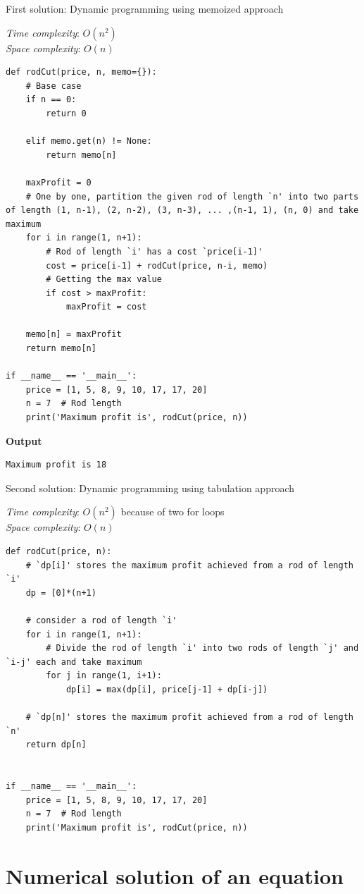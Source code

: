 \documentclass[a4paper,11pt]{book}
\begin{document}
\noindent First solution: Dynamic programming using memoized approach

\noindent \textit{Time complexity}: $O(n^2)$\\
\noindent \textit{Space complexity}: $O(n)$
\begin{lstlisting}
def rodCut(price, n, memo={}):
    # Base case
    if n == 0:
        return 0

    elif memo.get(n) != None:
        return memo[n]
 
    maxProfit = 0
    # One by one, partition the given rod of length `n' into two parts of length (1, n-1), (2, n-2), (3, n-3), ... ,(n-1, 1), (n, 0) and take maximum
    for i in range(1, n+1):
        # Rod of length `i' has a cost `price[i-1]'
        cost = price[i-1] + rodCut(price, n-i, memo)
        # Getting the max value
        if cost > maxProfit:
            maxProfit = cost

    memo[n] = maxProfit
    return memo[n]
 
if __name__ == '__main__':
    price = [1, 5, 8, 9, 10, 17, 17, 20]
    n = 7  # Rod length
    print('Maximum profit is', rodCut(price, n))
\end{lstlisting}
\textbf{Output}
\begin{lstlisting}
Maximum profit is 18
\end{lstlisting}

\noindent Second solution: Dynamic programming using tabulation approach

\noindent \textit{Time complexity}: $O(n^2)$ because of two for loops\\
\noindent \textit{Space complexity}: $O(n)$
\begin{lstlisting}
def rodCut(price, n):
    # `dp[i]' stores the maximum profit achieved from a rod of length `i'
    dp = [0]*(n+1)
 
    # consider a rod of length `i'
    for i in range(1, n+1):
        # Divide the rod of length `i' into two rods of length `j' and `i-j' each and take maximum
        for j in range(1, i+1):
            dp[i] = max(dp[i], price[j-1] + dp[i-j])
 
    # `dp[n]' stores the maximum profit achieved from a rod of length `n'
    return dp[n]

 
if __name__ == '__main__':
    price = [1, 5, 8, 9, 10, 17, 17, 20]
    n = 7  # Rod length
    print('Maximum profit is', rodCut(price, n))
\end{lstlisting}

\newpage\section{Numerical solution of an equation}
\end{document}
